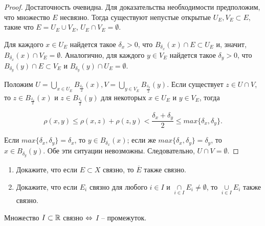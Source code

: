 \begin{proof}
    Достаточность очевидна. Для доказательства необходимости предположим, что множество $E$ несвязно. Тогда существуют непустые открытые $U_{E}, V_{E} \subset E$, такие что $E = U_{E} \cup V_{E}$, $U_{E} \cap V_{E} = \emptyset$.

    Для каждого $x \in U_{E}$ найдется такое $\delta_{x} > 0$, что $B_{\delta_{x}}(x) \cap E \subset U_{E}$ и, значит, $B_{\delta_{x}}(x) \cap V_{E} = \emptyset$. Аналогично, для каждого $y \in V_{E}$ найдется такое $\delta_{y} > 0$, что $B_{\delta_{y}}(y) \cap E \subset V_{E}$ и $B_{\delta_{y}}(y) \cap U_{E} = \emptyset$.

    Положим $U = \underset{x \in U_{E}}{\bigcup} B_{\frac{\delta_{x}}{2}}(x), V = \underset{y \in V_{E}}{\bigcup} B_{\frac{\delta_{y}}{2}}(y)$. Если существует $z \in U \cap V$, то $z \in B_{\frac{\delta_{x}}{2}}(x)$ и $z \in B_{\frac{\delta_{y}}{2}}(y)$ для некоторых $x \in U_{E}$ и $y \in V_{E}$, тогда 

    \[\rho(x, y) \leq \rho(x, z) + \rho(z, y) < \frac{\delta_{x} + \delta_{y}}{2} \leq max\{\delta_{x}, \delta_{y}\}.\]

    Если $max\{\delta_{x}, \delta_{y}\} = \delta_{x}$, то $y \in B_{\delta_{x}}(x)$; если же $max\{\delta_{x}, \delta_{y}\} = \delta_{y}$, то $x \in B_{\delta_{y}}(y)$. Обе эти ситуации невозможны. Следовательно, $U \cap V = \emptyset$.
\end{proof}

\begin{problem}
    \begin{enumerate}
        \item Докажите, что если $E \subset X$ связно, то $\overline{E}$ также связно.
        \item Докажите, что если $E_{i}$ связно для любого $i \in I$ и $\underset{i \in I}{\cap} E_{i} \neq \emptyset$, то $\underset{i \in I}{\cup} E_{i}$ также связно.
    \end{enumerate}
\end{problem}

\begin{theorem}
    \label{th_coher_spac}
    Множество $I \subset \mathbb{R}$ связно $\Leftrightarrow$ $I$ -- промежуток.
\end{theorem}

